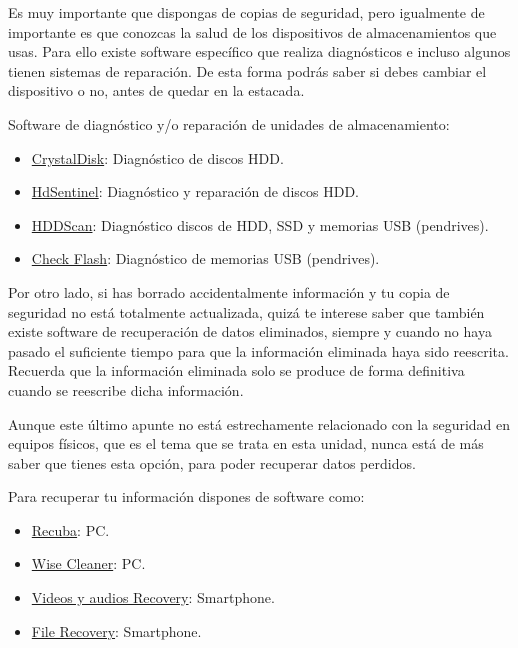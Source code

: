 \documentclass[
  spanish,
  a4paper,
  openany]{book}
\begin{document}
Es muy importante que dispongas de copias de seguridad, pero igualmente de importante es que conozcas la salud de los dispositivos de almacenamientos que usas. Para ello existe software específico que realiza diagnósticos e incluso algunos tienen sistemas de reparación. De esta forma podrás saber si debes cambiar el dispositivo o no, antes de quedar en la estacada.

Software de diagnóstico y/o reparación de unidades de almacenamiento:

\begin{itemize}
\item
  \href{https://crystalmark.info/en/software/crystaldiskinfo/}{CrystalDisk}: Diagnóstico de discos HDD.
\item
  \href{https://www.hdsentinel.com/}{HdSentinel}: Diagnóstico y reparación de discos HDD.
\item
  \href{https://hddscan.com/}{HDDScan}: Diagnóstico discos de HDD, SSD y memorias USB (pendrives).
\item
  \href{http://mikelab.kiev.ua/index_en.php?page=PROGRAMS/chkflsh_en}{Check Flash}: Diagnóstico de memorias USB (pendrives).
\end{itemize}

Por otro lado, si has borrado accidentalmente información y tu copia de seguridad no está totalmente actualizada, quizá te interese saber que también existe software de recuperación de datos eliminados, siempre y cuando no haya pasado el suficiente tiempo para que la información eliminada haya sido reescrita. Recuerda que la información eliminada solo se produce de forma definitiva cuando se reescribe dicha información.

Aunque este último apunte no está estrechamente relacionado con la seguridad en equipos físicos, que es el tema que se trata en esta unidad, nunca está de más saber que tienes esta opción, para poder recuperar datos perdidos.

Para recuperar tu información dispones de software como:

\begin{itemize}
\item
  \href{https://www.ccleaner.com/recuva}{Recuba}: PC.
\item
  \href{https://www.wisecleaner.com/wise-data-recovery.html}{Wise Cleaner}: PC.
\item
  \href{https://play.google.com/store/apps/details?id=com.mediarecovery.deletedvideorecovery.deletedaudiorecovery\&hl=es}{Videos y audios Recovery}: Smartphone.
\item
  \href{https://play.google.com/store/apps/details?id=com.file.recovery.data.recovery.deletedfilerecovery}{File Recovery}: Smartphone.
\end{itemize}
\end{document}
